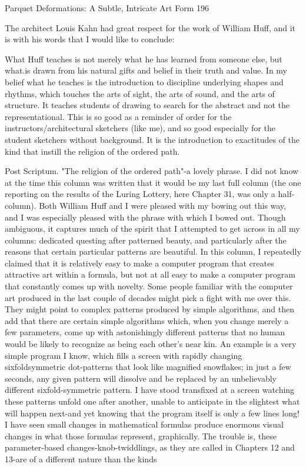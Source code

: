 Parquet Deformations: A Subtle, Intricate Art Form                                      196

       The architect Louis Kahn had great respect for the work of William Huff, and it is
with his words that I would like to conclude:

           What Huff teaches is not merely what he has learned from someone else,
   but what.is drawn from his natural gifts and belief in their truth and value. In my
   belief what he teaches is the introduction to discipline underlying shapes and
   rhythms, which touches the arts of sight, the arts of sound, and the arts of structure.
   It teaches students of drawing to search for the abstract and not the representational.
   This is so good as a reminder of order for the instructors/architectural sketchers
   (like me), and so good especially for the student sketchers without background. It is
   the introduction to exactitudes of the kind that instill the religion of the ordered
   path.


Post Scriptum.
        "The religion of the ordered path"-a lovely phrase. I did not know at the time this
column was written that it would be my last full column (the one reporting on the results
of the Luring Lottery, here Chapter 31, was only a half-column). Both William Huff and I
were pleased with my bowing out this way, and I was especially pleased with the phrase
with which I bowed out. Though ambiguous, it captures much of the spirit that I
attempted to get across in all my columns: dedicated questing after patterned beauty, and
particularly after the reasons that certain particular patterns are beautiful.
        In this column, I repeatedly claimed that it is relatively easy to make a computer
program that creates attractive art within a formula, but not at all easy to make a
computer program that constantly comes up with novelty. Some people familiar with the
computer art produced in the last couple of decades might pick a fight with me over this.
They might point to complex patterns produced by simple algorithms, and then add that
there are certain simple algorithms which, when you change merely a few parameters,
come up with astonishingly different patterns that no human would be likely to recognize
as being each other's near kin. An example is a very simple program I know, which fills a
screen with rapidly changing sixfoldsymmetric dot-patterns that look like magnified
snowflakes; in just a few seconds, any given pattern will dissolve and be replaced by an
unbelievably different sixfold-symmetric pattern. I have stood transfixed at a screen
watching these patterns unfold one after another, unable to anticipate in the slightest what
will happen next-and yet knowing that the program itself is only a few lines long! I have
seen small changes in mathematical formulas produce enormous visual changes in what
those formulas represent, graphically.
        The trouble is, these parameter-based changes-knob-twiddlings, as they are called
in Chapters 12 and 13-are of a different nature than the kinds




